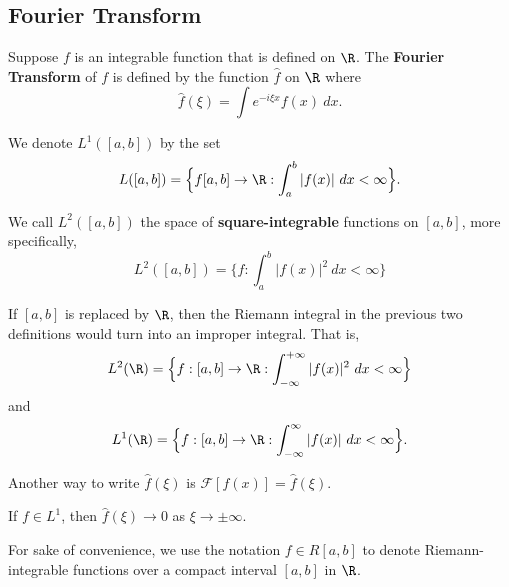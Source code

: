 \subsection{Fourier Transform}

\begin{definition}\label{Fourier Transform}
    Suppose \( f  \) is an integrable function that is defined on \( \R \). The \textbf{Fourier Transform} of \( f \) is defined by the function \( \hat{f} \) on \( \R \) where
    \[  \hat{f}(\xi) = \int e^{- i \xi x } f(x)  \ dx. \]
\end{definition}


\begin{definition}[\( L^1 \) space]\label{L1 Space}
    We denote \( L^{1}([a,b]) \) by the set
    \[ L([a,b]) =  \Big\{ f[a,b] \to \R : \int_{ a }^{ b } | f(x) |  \ dx < \infty  \Big\}.  \]
\end{definition}

\begin{definition}\label{L2 Space}
    We call \( L^{2}([a,b]) \) the space of \textbf{square-integrable} functions on \( [a,b] \), more specifically, 
    \[  L^{2}([a,b]) = \Big\{ f : \int_{ a }^{ b }  | f(x) |^{2} \ dx < \infty  \Big\} \]
\end{definition}

\begin{remark}
    If \( [a,b] \) is replaced by \( \R  \), then the Riemann integral in the previous two definitions would turn into an improper integral. That is,
    \[   L^{2}(\R)  =  \Big\{ f:[a,b] \to \R : \int_{ - \infty  }^{ + \infty  }  | f(x) |^{2}  \ dx < \infty  \Big\}  \]
    and
    \[  L^{1}(\R) = \Big\{ f:[a,b] \to \R : \int_{ - \infty   }^{  \infty  }  | f(x) |  \ dx < \infty \Big\}.  \]
\end{remark}


\begin{remark}
    Another way to write \( \hat{f}(\xi) \) is \( \mathcal{F} [f(x)] = \hat{f}(\xi) \).
\end{remark}

\begin{lemma}\label{Riemann-Lebesgue}
    If \( f \in L^{1} \), then \( \hat{f}(\xi) \to 0 \) as \( \xi \to \pm \infty  \).
\end{lemma}

For sake of convenience, we use the notation \( f \in R[a,b] \) to denote Riemann-integrable functions over a compact interval \( [a,b] \) in \( \R  \).


